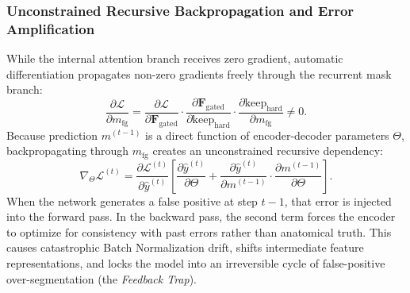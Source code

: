 \subsubsection{Unconstrained Recursive Backpropagation and Error Amplification}
While the internal attention branch receives zero gradient, automatic differentiation propagates non-zero gradients freely through the recurrent mask branch:
\begin{equation}
  \frac{\partial \mathcal{L}}{\partial m_{\text{fg}}} = \frac{\partial \mathcal{L}}{\partial \mathbf{F}_{\text{gated}}} \cdot \frac{\partial \mathbf{F}_{\text{gated}}}{\partial \text{keep}_{\text{hard}}} \cdot \frac{\partial \text{keep}_{\text{hard}}}{\partial m_{\text{fg}}} \neq 0.
\end{equation}
Because prediction $m^{(t-1)}$ is a direct function of encoder-decoder parameters $\Theta$, backpropagating through $m_{\text{fg}}$ creates an unconstrained recursive dependency:
\begin{equation}
  \nabla_\Theta \mathcal{L}^{(t)} = \frac{\partial \mathcal{L}^{(t)}}{\partial \hat{y}^{(t)}} \left[ \frac{\partial \hat{y}^{(t)}}{\partial \Theta} + \frac{\partial \hat{y}^{(t)}}{\partial m^{(t-1)}} \cdot \frac{\partial m^{(t-1)}}{\partial \Theta} \right].
\end{equation}
When the network generates a false positive at step $t-1$, that error is injected into the forward pass. In the backward pass, the second term forces the encoder to optimize for consistency with past errors rather than anatomical truth. This causes catastrophic Batch Normalization drift, shifts intermediate feature representations, and locks the model into an irreversible cycle of false-positive over-segmentation (the \textit{Feedback Trap}).

